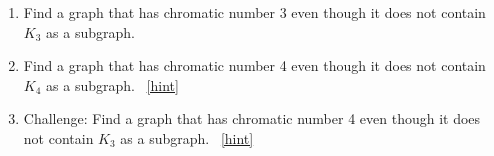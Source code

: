 \documentclass{book}
\begin{document}
\setcounter{project}{43}
\addtocounter{project}{-1}
\begin{activity}[]\label{activity-36}
\leavevmode%
\begin{enumerate}[font=\bfseries,label=(\alph*),ref=\alph*]
\item\label{task-58} \hypertarget{p-402}{}%
Find a graph that has chromatic number 3 even though it does not contain \(K_3\) as a subgraph.%
\item\label{task-59} \hypertarget{p-404}{}%
Find a graph that has chromatic number 4 even though it does not contain \(K_4\) as a subgraph.%
~\hfill{\tiny\hyperlink{a-43.b}{[hint]}\hypertarget{q-43.b}{}}\item\label{task-60} \hypertarget{p-407}{}%
Challenge: Find a graph that has chromatic number 4 even though it does not contain \(K_3\) as a subgraph.%
~\hfill{\tiny\hyperlink{a-43.c}{[hint]}\hypertarget{q-43.c}{}}\end{enumerate}
\end{activity}
\end{document}
